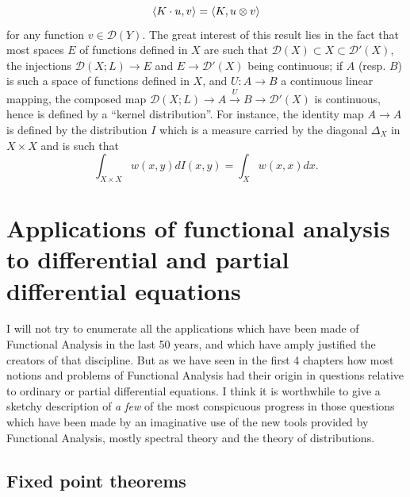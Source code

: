 \documentclass[12pt,a4paper,leqno,twoside]{extbook}
\DeclarePairedDelimiter{\ip}{\langle}{\rangle}
\begin{document}
\begin{equation}
    \label{eq:8.14}
    \ip{K \cdot u, v} = \ip{K, u \otimes v}
\end{equation}
for any function \(v \in \mathcal{D}(Y)\). The great interest of this result lies in the fact that most spaces \(E\) of functions defined in \(X\) are such that \(\mathcal{D}(X) \subset X \subset \mathcal{D}'(X)\), the injections \(\mathcal{D}(X; L) \to E\) and \(E \to \mathcal{D}'(X)\) being continuous; if \(A\) (resp. \(B\)) is such a space of functions defined in \(X\), and \(U: A \to B\) a continuous linear mapping, the composed map \(\mathcal{D}(X; L) \to A \xrightarrow{U} B \to \mathcal{D}'(X)\) is continuous, hence is defined by a ``kernel distribution''. For instance, the identity map \(A \to A\) is defined by the distribution \(I\) which is a measure carried by the diagonal \(\Delta_X\) in \(X \times X\) and is such that
\[
    \int_{X \times X} w(x,y) dI(x,y) = \int_X w(x,x) dx.
\]

\chapter{Applications of functional analysis to differential and partial differential equations}
\label{ch:9}
\setcounter{equation}{0}

I will not try to enumerate all the applications which have been made of Functional Analysis in the last 50 years, and which have amply justified the creators of that discipline. But as we have seen in the first 4 chapters how most notions and problems of Functional Analysis had their origin in questions relative to ordinary or partial differential equations. I think it is worthwhile to give a sketchy description of \emph{a few} of the most conspicuous progress in those questions which have been made by an imaginative use of the new tools provided by Functional Analysis, mostly spectral theory and the theory of distributions.

\section{Fixed point theorems}
\label{sec:9.1}
\end{document}

